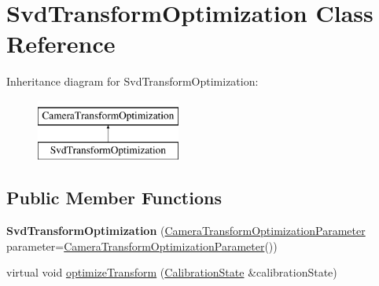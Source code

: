 \hypertarget{classSvdTransformOptimization}{\section{\-Svd\-Transform\-Optimization \-Class \-Reference}
\label{classSvdTransformOptimization}
}
\-Inheritance diagram for \-Svd\-Transform\-Optimization\-:\begin{figure}[H]
\begin{center}
\leavevmode
\includegraphics[height=2.000000cm]{classSvdTransformOptimization}
\end{center}
\end{figure}
\subsection*{\-Public \-Member \-Functions}
\begin{DoxyCompactItemize}
\item 
\hypertarget{classSvdTransformOptimization_a51a90a884290d5898a27dcb8cbb12980}{{\bfseries \-Svd\-Transform\-Optimization} (\hyperlink{classCameraTransformOptimizationParameter}{\-Camera\-Transform\-Optimization\-Parameter} parameter=\hyperlink{classCameraTransformOptimizationParameter}{\-Camera\-Transform\-Optimization\-Parameter}())}\label{classSvdTransformOptimization_a51a90a884290d5898a27dcb8cbb12980}

\item 
virtual void \hyperlink{classSvdTransformOptimization_afd4d0ed3de6c59535ede1f06134463e8}{optimize\-Transform} (\hyperlink{classCalibrationState}{\-Calibration\-State} \&calibration\-State)
\end{DoxyCompactItemize}


